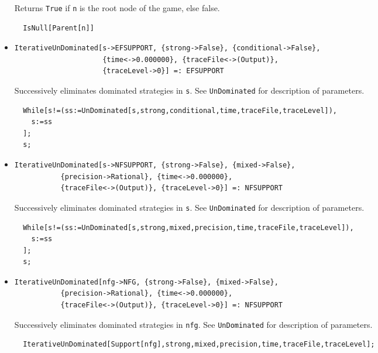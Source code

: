 \begin{itemize}
\bd 
Returns \verb+True+ if \verb+n+ is the root node of the game, else
false.  
\begin{verbatim}
  IsNull[Parent[n]]
\end{verbatim} 
\ed

\item{}
\protect \large \begin{verbatim}
IterativeUnDominated[s->EFSUPPORT, {strong->False}, {conditional->False}, 
                     {time<->0.000000}, {traceFile<->(Output)}, 
                     {traceLevel->0}] =: EFSUPPORT 
\end{verbatim}\normalsize

\bd 
Successively eliminates dominated strategies in \verb+s+. See
\verb+UnDominated+ for description of parameters.  
\begin{verbatim}
  While[s!=(ss:=UnDominated[s,strong,conditional,time,traceFile,traceLevel]),
    s:=ss
  ];
  s;
\end{verbatim} 
\ed

\item{}
\protect \large \begin{verbatim}
IterativeUnDominated[s->NFSUPPORT, {strong->False}, {mixed->False}, 
           {precision->Rational}, {time<->0.000000}, 
           {traceFile<->(Output)}, {traceLevel->0}] =: NFSUPPORT 
\end{verbatim}\normalsize

\bd 
Successively eliminates dominated strategies in \verb+s+. See
\verb+UnDominated+ for description of parameters.  
\begin{verbatim}
  While[s!=(ss:=UnDominated[s,strong,mixed,precision,time,traceFile,traceLevel]),
    s:=ss
  ];
  s;
\end{verbatim} 
\ed

\item{}
\protect \large \begin{verbatim}
IterativeUnDominated[nfg->NFG, {strong->False}, {mixed->False}, 
           {precision->Rational}, {time<->0.000000}, 
           {traceFile<->(Output)}, {traceLevel->0}] =: NFSUPPORT 
\end{verbatim}\normalsize

\bd 
Successively eliminates dominated strategies in \verb+nfg+.  See
\verb+UnDominated+ for description of parameters.  
\begin{verbatim}
  IterativeUnDominated[Support[nfg],strong,mixed,precision,time,traceFile,traceLevel];
\end{verbatim} 
\ed


\end{itemize}
